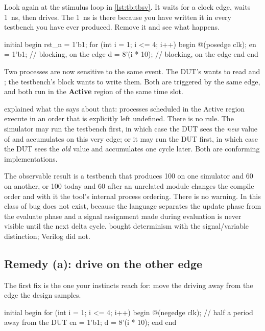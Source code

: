 Look again at the stimulus loop in
\cref{lst:tb:tbsv}. It waits for a clock edge, waits \SI{1}{\nano\second}, then
drives. The \SI{1}{\nano\second} is there because you have written it in every
\VHDL{} testbench you have ever produced. Remove it and see what happens.

\begin{svcode}[caption={A racy stimulus loop. Do not write this},label={lst:tb:racy}]
initial begin
  rst_n = 1'b1;
  for (int i = 1; i <= 4; i++) begin
    @(posedge clk);
    en = 1'b1;          // blocking, on the edge
    d  = 8'(i * 10);    // blocking, on the edge
  end
end
\end{svcode}

Two processes are now sensitive to the same event. The DUT's
 wants to read  and ; the
testbench's  block wants to write them. Both are triggered by the
same edge, and both run in the \textbf{Active} region of the same time slot.

 explained what the \LRM{} says about that: processes
scheduled in the Active region execute in an order that is explicitly left
undefined. There is no rule. The simulator may run the testbench first, in
which case the DUT sees the \emph{new} value of  and accumulates on
this very edge; or it may run the DUT first, in which case the DUT sees the
\emph{old} value and accumulates one cycle later. Both are conforming
implementations.

The observable result is a testbench that produces 100 on one simulator and 60
on another, or 100 today and 60 after an unrelated module changes the compile
order and with it the tool's internal process ordering. There is no warning. In
\VHDL{} this class of bug does not exist, because the language separates the
update phase from the evaluate phase and a signal assignment made during
evaluation is never visible until the next delta cycle. \VHDL{} bought
determinism with the signal/variable distinction; Verilog did not.

\subsection{Remedy (a): drive on the other edge}

The first fix is the one your \VHDL{} instincts reach for: move the driving
away from the edge the design samples.

\begin{svcode}
initial begin
  for (int i = 1; i <= 4; i++) begin
    @(negedge clk);       // half a period away from the DUT
    en = 1'b1;
    d  = 8'(i * 10);
  end
end
\end{svcode}

